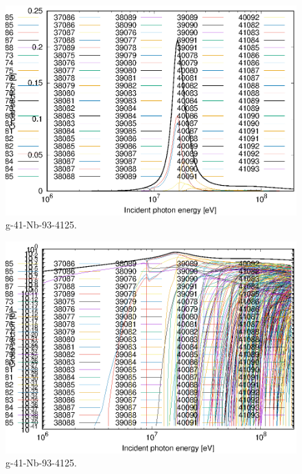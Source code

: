 \begin{figure}
 \includegraphics[width=\linewidth]{eps/g_41-Nb-93_4125.eps}
  \caption{g-41-Nb-93-4125.}
\end{figure}
\begin{figure}
 \includegraphics[width=\linewidth]{eps-log/g_41-Nb-93_4125.eps}
 \caption{g-41-Nb-93-4125.}
\end{figure}
\newpage \clearpage

